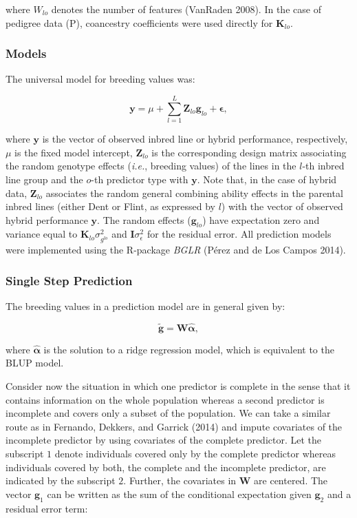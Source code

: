 \documentclass[]{elsarticle} %
\begin{document}
where \(W_{lo}\) denotes the number of features (VanRaden 2008). In the
case of pedigree data (P), coancestry coefficients were used directly
for \(\mathbf{K}_{lo}\).

\subsubsection{Models}\label{models}

The universal model for breeding values was:

\begin{equation} \label{eq:KBLUPModel}
  \mathbf{y} = \mu + 
  \sum_{l=1}^{L} \mathbf{Z}_{lo} \mathbf{g}_{lo} +
  \mathbf{\epsilon},
\end{equation}

where \(\mathbf{y}\) is the vector of observed inbred line or hybrid
performance, respectively, \(\mu\) is the fixed model intercept,
\(\mathbf{Z}_{lo}\) is the corresponding design matrix associating the
random genotype effects (\emph{i.e.}, breeding values) of the lines in
the \(l\)-th inbred line group and the \(o\)-th predictor type with
\(\mathbf{y}\). Note that, in the case of hybrid data,
\(\mathbf{Z}_{lo}\) associates the random general combining ability
effects in the parental inbred lines (either Dent or Flint, as expressed
by \(l\)) with the vector of observed hybrid performance \(\mathbf{y}\).
The random effects (\(\mathbf{g}_{lo}\)) have expectation zero and
variance equal to \(\mathbf{K}_{lo} \sigma^{2}_{{g}^{lo}}\) and
\(\mathbf{I} \sigma^2_{\epsilon}\) for the residual error. All
prediction models were implemented using the R-package \emph{BGLR}
(Pérez and de Los Campos 2014).

\subsubsection{Single Step Prediction}\label{single-step-prediction}

The breeding values in a prediction model are in general given by:

\begin{equation} \label{eq:mrnaebv}
    \mathbf{\tilde{g}} = \mathbf{W}\boldsymbol{\hat{\alpha}},
\end{equation}

where \(\boldsymbol{\hat{\alpha}}\) is the solution to a ridge
regression model, which is equivalent to the BLUP model.

Consider now the situation in which one predictor is complete in the
sense that it contains information on the whole population whereas a
second predictor is incomplete and covers only a subset of the
population. We can take a similar route as in Fernando, Dekkers, and
Garrick (2014) and impute covariates of the incomplete predictor by
using covariates of the complete predictor. Let the subscript \(1\)
denote individuals covered only by the complete predictor whereas
individuals covered by both, the complete and the incomplete predictor,
are indicated by the subscript \(2\). Further, the covariates in
\(\mathbf{W}\) are centered. The vector \(\mathbf{g}_1\) can be written
as the sum of the conditional expectation given \(\mathbf{g}_2\) and a
residual error term:
\end{document}
